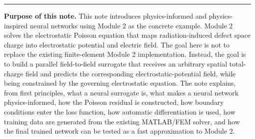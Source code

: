 \documentclass[11pt]{article}
\begin{document}

\hrule
\vspace{0.8em}

\begin{overviewbox}
\textbf{Purpose of this note.} This note introduces physics-informed and physics-inspired neural networks using Module 2 as the concrete example. Module 2 solves the electrostatic Poisson equation that maps radiation-induced defect space charge into electrostatic potential and electric field. The goal here is not to replace the existing finite-element Module 2 implementation. Instead, the goal is to build a parallel field-to-field surrogate that receives an arbitrary spatial total-charge field and predicts the corresponding electrostatic-potential field, while being constrained by the governing electrostatic equation. The note explains, from first principles, what a neural surrogate is, what makes a neural network physics-informed, how the Poisson residual is constructed, how boundary conditions enter the loss function, how automatic differentiation is used, how training data are generated from the existing MATLAB/FEM solver, and how the final trained network can be tested as a fast approximation to Module 2.
\end{overviewbox}

\ProjectTOC

\SymbolsAcronymsSection
\end{document}
